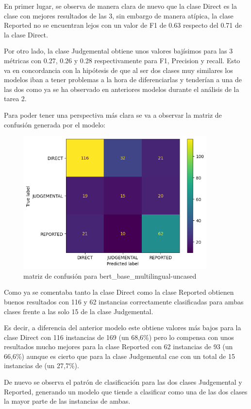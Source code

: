 En primer lugar, se observa de manera clara de nuevo que la clase Direct es la clase con mejores resultados de las 3, sin embargo de manera atípica, la clase Reported no se encuentran lejos con un valor de F1 de 0.63 respecto del 0.71 de la clase Direct.

Por otro lado, la clase Judgemental obtiene unos valores bajísimos para las 3 métricas con 0.27, 0.26 y 0.28 respectivamente para F1, Precision y recall. Esto va en concordancia con la hipótesis de que al ser dos clases muy similares los modelos iban a tener problemas a la hora de diferenciarlas y tenderían a una de las dos como ya se ha observado en anteriores modelos durante el análisis de la tarea 2.

Para poder tener una perspectiva más clara se va a observar la matriz de confusión generada por el modelo:

\begin{figure}[H]
    \centering
    \includegraphics[width=10cm]{imagenes/Evaluacion/confusion_matrix/bert_base_multilingual-uncased-all-dirty_task2.png}
    \caption{\centering matriz de confusión para bert\_base\_multilingual-uncased}
\end{figure}

Como ya se comentaba tanto la clase Direct como la clase Reported obtienen buenos resultados con 116 y 62 instancias correctamente clasificadas para ambas clases frente a las solo 15 de la clase Judgemental.

Es decir, a diferencia del anterior modelo este obtiene valores más bajos para la clase Direct con 116 instancias de 169 (un 68,6\%) pero lo compensa con unos resultados mucho mejores para la clase Reported con 62 instancias de 93 (un 66,6\%) aunque es cierto que para la clase Judgemental cae con un total de 15 instancias de (un 27,7\%).

De nuevo se observa el patrón de clasificación para las dos clases Judgemental y Reported, generando un modelo que tiende a clasificar como una de las dos clases la mayor parte de las instancias de ambas.


